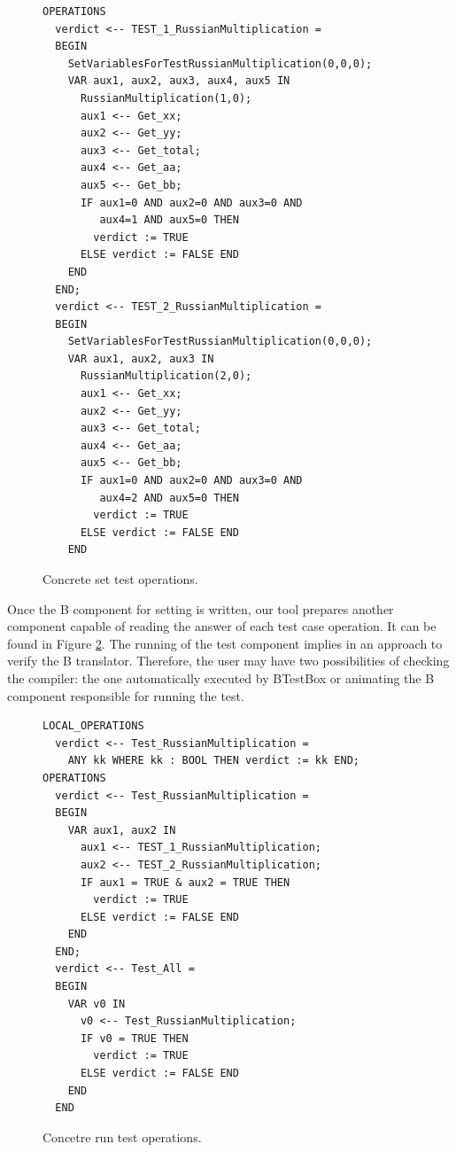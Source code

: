 \documentclass[runningheads]{llncs}
\begin{document}
\begin{figure}
    \centering
    \begin{minipage}{0.45\textwidth}
        \centering
        
        \begin{verbatim}
OPERATIONS
  verdict <-- TEST_1_RussianMultiplication =
  BEGIN 
    SetVariablesForTestRussianMultiplication(0,0,0);
    VAR aux1, aux2, aux3, aux4, aux5 IN
      RussianMultiplication(1,0);
      aux1 <-- Get_xx;
      aux2 <-- Get_yy;
      aux3 <-- Get_total;
      aux4 <-- Get_aa;
      aux5 <-- Get_bb;
      IF aux1=0 AND aux2=0 AND aux3=0 AND
         aux4=1 AND aux5=0 THEN
        verdict := TRUE
      ELSE verdict := FALSE END
    END 
  END;
  verdict <-- TEST_2_RussianMultiplication =
  BEGIN 
    SetVariablesForTestRussianMultiplication(0,0,0);
    VAR aux1, aux2, aux3 IN
      RussianMultiplication(2,0);
      aux1 <-- Get_xx;
      aux2 <-- Get_yy;
      aux3 <-- Get_total;
      aux4 <-- Get_aa;
      aux5 <-- Get_bb;
      IF aux1=0 AND aux2=0 AND aux3=0 AND
         aux4=2 AND aux5=0 THEN
        verdict := TRUE
      ELSE verdict := FALSE END
    END 
                \end{verbatim}
        \caption{Concrete set test operations.}
        \label{fig:SetTestModel}
    \end{minipage}%
\end{figure}

Once the B component for setting is written, our tool prepares another component capable of reading the answer of each test case operation. It can be found in Figure \ref{fig:RunTestModel}. The running of the test component implies in an approach to verify the B translator. Therefore, the user may have two possibilities of checking the compiler: the one automatically executed by BTestBox or animating the B component responsible for running the test.

\begin{figure}
    \centering
    \begin{minipage}{0.45\textwidth}
        \centering
        \begin{verbatim}
LOCAL_OPERATIONS
  verdict <-- Test_RussianMultiplication =
    ANY kk WHERE kk : BOOL THEN verdict := kk END;
OPERATIONS
  verdict <-- Test_RussianMultiplication =
  BEGIN
    VAR aux1, aux2 IN
      aux1 <-- TEST_1_RussianMultiplication;
      aux2 <-- TEST_2_RussianMultiplication;
      IF aux1 = TRUE & aux2 = TRUE THEN
        verdict := TRUE
      ELSE verdict := FALSE END
    END
  END;
  verdict <-- Test_All =
  BEGIN 
    VAR v0 IN
      v0 <-- Test_RussianMultiplication;
      IF v0 = TRUE THEN
        verdict := TRUE
      ELSE verdict := FALSE END
    END
  END
        \end{verbatim}
        \caption{Concetre run test operations.}
        \label{fig:RunTestModel}
    \end{minipage}
\end{figure}
\end{document}
